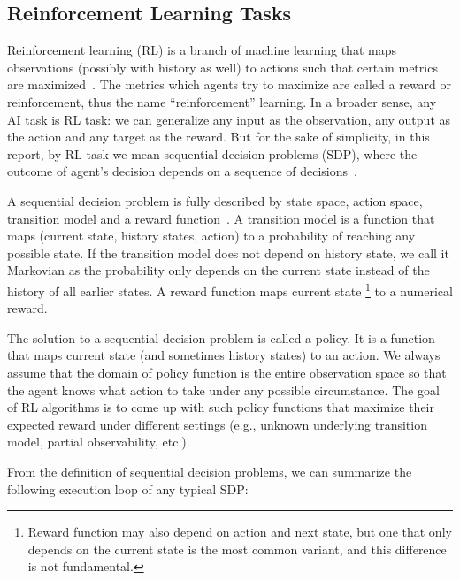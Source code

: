 \documentclass[fyp]{socreport}
\begin{document}
\subsection{Reinforcement Learning Tasks}
Reinforcement learning (RL) is a branch of machine learning that maps observations (possibly with history as well) to actions such that certain metrics are maximized~\cite{sutton-barto}. The metrics which agents try to maximize are called a reward or reinforcement, thus the name “reinforcement” learning. In a broader sense, any AI task is RL task: we can generalize any input as the observation, any output as the action and any target as the reward. But for the sake of simplicity, in this report, by RL task we mean sequential decision problems (SDP), where the outcome of agent’s decision depends on a sequence of decisions~\cite{russell}.

A sequential decision problem is fully described by state space, action space, transition model and a reward function~\cite{russell}. A transition model is a function that maps (current state, history states, action) to a probability of reaching any possible state. If the transition model does not depend on history state, we call it Markovian as the probability only depends on the current state instead of the history of all earlier states. A reward function maps current state \footnote{Reward function may also depend on action and next state, but one that only depends on the current state is the most common variant, and this difference is not fundamental.} to a numerical reward.

The solution to a sequential decision problem is called a policy. It is a function that maps current state (and sometimes history states) to an action. We always assume that the domain of policy function is the entire observation space so that the agent knows what action to take under any possible circumstance. The goal of RL algorithms is to come up with such policy functions that maximize their expected reward under different settings (e.g., unknown underlying transition model, partial observability, etc.).

From the definition of sequential decision problems, we can summarize the following execution loop of any typical SDP:
\end{document}
